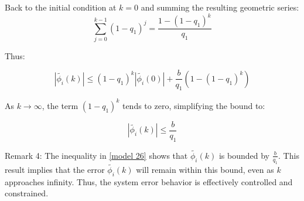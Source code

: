 \documentclass[journal,onecolumn]{IEEEtran}
\begin{document}
Back to the initial condition at \(k=0\) and summing the resulting geometric series:
\[
\sum_{j=0}^{k-1} (1-q_1)^j = \frac{1-(1-q_1)^k}{q_1}
\]

Thus:

\begin{equation}
\label{model 25}
|\tilde{\phi_i}(k)| \leq (1 - q_1)^k |\tilde{\phi_i}(0)| + \frac{b}{q_1} (1 - (1 - q_1)^k)
\end{equation}

As \(k \rightarrow \infty\), the term \((1-q_1)^k\) tends to zero, simplifying the bound to:

\begin{equation}
\label{model 26}
|\tilde{\phi_i}(k)| \leq \frac{b}{q_1}
\end{equation}



Remark 4: The inequality in \eqref{model 26} shows that \(\tilde{\phi_i}(k)\) is bounded by \(\frac{b}{q_1}\). This result implies that the error \(\tilde{\phi_i}(k)\) will remain within this bound, even as \(k\) approaches infinity. Thus, the system error behavior is effectively controlled and constrained.

    



\end{document}

